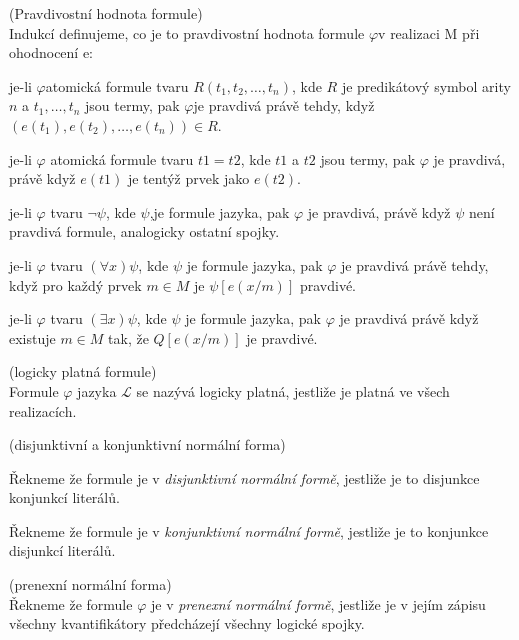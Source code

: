 \begin{definition}{(Pravdivostní hodnota formule)}\\
Indukcí definujeme, co je to pravdivostní hodnota formule $\varphi$v realizaci M při ohodnocení e:
\bce[(i)]
\item je-li $\varphi$atomická formule tvaru $R(t_1, t_2, \dots, t_n)$, kde $R$ je predikátový symbol arity $n$ a $t_1,\ldots, t_n$ jsou termy, pak $\varphi$je pravdivá právě tehdy, když $(e(t_1), e(t_2), \dots, e(t_n)) \in R$.
\item je-li $\varphi$ atomická formule tvaru $t1 = t2$, kde $t1$ a $t2$ jsou termy, pak $\varphi$ je pravdivá, právě když $e(t1)$ je tentýž prvek jako $e(t2)$.
\item je-li $\varphi$ tvaru $\neg \psi$, kde $\psi$,je formule jazyka, pak $\varphi$ je pravdivá, právě když $\psi$ není pravdivá formule, analogicky ostatní spojky.
\item je-li $\varphi$ tvaru $(\forall x) \psi$, kde $\psi$ je formule jazyka, pak $\varphi$ je pravdivá právě tehdy, když pro každý prvek $m \in M$ je $\psi[e(x/m)]$ pravdivé.
\item je-li $\varphi$ tvaru $(\exists x) \psi$, kde $\psi$ je formule jazyka, pak $\varphi$ je pravdivá právě když existuje $m \in M$ tak, že $Q[e(x/m)]$ je pravdivé.
\ece
\end{definition}

\begin{definition}{(logicky platná formule)}\\
Formule $\varphi$ jazyka $\mathscr{L}$ se nazývá logicky platná, jestliže je platná ve všech realizacích.
\end{definition}

\begin{definition}{(disjunktivní a konjunktivní normální forma)}\\
\bce[(i)]
\item Řekneme že formule je v \emph{disjunktivní normální formě}, jestliže je to disjunkce konjunkcí literálů.
\item Řekneme že formule je v \emph{konjunktivní normální formě}, jestliže je to konjunkce disjunkcí literálů.
\ece
\end{definition}

\begin{definition}{(prenexní normální forma)}\\
Řekneme že formule $\varphi$ je v \emph{prenexní normální formě}, jestliže je v jejím zápisu všechny kvantifikátory předcházejí všechny logické spojky.
\end{definition}

